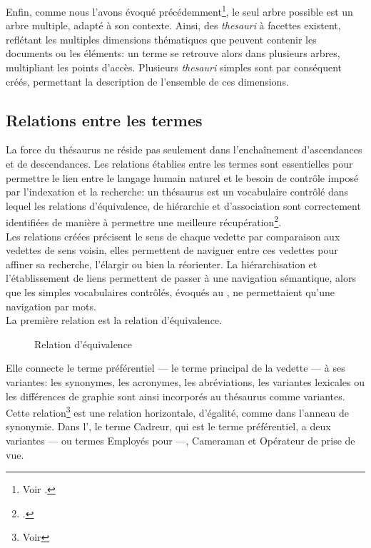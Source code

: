 

Enfin, comme nous l'avons évoqué précédemment\footnote{Voir .}, le seul arbre possible est un arbre multiple, adapté à son contexte. Ainsi, des \textit{thesauri} à facettes existent, reflétant les multiples dimensions thématiques que peuvent contenir les documents ou les éléments: un terme se retrouve alors dans plusieurs arbres, multipliant les points d'accès. Plusieurs \textit{thesauri} simples sont par conséquent créés, permettant la description de l'ensemble de ces dimensions.

\subsection{\label{I-C-2-b}Relations entre les termes}

La force du thésaurus ne réside pas seulement dans l'enchaînement d'ascendances et de descendances. Les relations établies entre les termes sont essentielles pour permettre le lien entre le langage humain naturel et le besoin de contrôle imposé par l'indexation et la recherche: un thésaurus est \og un vocabulaire contrôlé dans lequel les relations d'équivalence, de hiérarchie et d'association sont correctement identifiées de manière à permettre une meilleure récupération\fg{}\footcite{rosenfeld_information_2015}.\\

Les relations créées précisent le sens de chaque vedette par comparaison aux vedettes de sens voisin, elles permettent de naviguer entre ces vedettes pour affiner sa recherche, l'élargir ou bien la réorienter. La hiérarchisation et l'établissement de liens permettent de passer à une navigation sémantique, alors que les simples vocabulaires contrôlés, évoqués au , ne permettaient qu'une navigation par mots.\\

La première relation est la relation d'équivalence.
\begin{wrapfigure}{L}{4cm}
	\centering
	
	\caption{Relation d'équivalence}
	\label{relation_equivalence}	
\end{wrapfigure} Elle connecte le terme préférentiel --- le terme principal de la vedette --- à ses variantes: les synonymes, les acronymes, les abréviations, les variantes lexicales ou les différences de graphie sont ainsi incorporés au thésaurus comme variantes. Cette relation\footnote{Voir } est une relation horizontale, d'égalité, comme dans l'anneau de synonymie. Dans l', le terme \og Cadreur\fg{}, qui est le terme préférentiel, a deux variantes --- ou termes \og Employés pour\fg{} ---, \og Cameraman\fg{} et \og Opérateur de prise de vue\fg{}.\\

